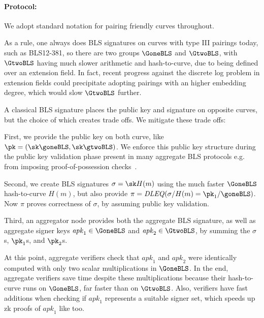 \paragraph{Protocol:}

We adopt standard notation for pairing friendly curves throughout.

As a rule, one always does BLS signatures on curves with type III pairings
today, such as BLS12-381, so there are two groups $\GoneBLS$ and $\GtwoBLS$,
with $\GtwoBLS$ having much slower arithmetic and hash-to-curve, due to
being defined over an extension field.  In fact, recent progress
\cite{TNFS} against the discrete log problem in extension fields
could precipitate adopting pairings with an higher embedding degree,
which would slow $\GtwoBLS$ further.

A classical BLS signature places the public key and signature on opposite
curves, but the choice of which creates trade offs.  We mitigate these
trade offs:

First, we provide the public key on both curve,
 like $\pk = (\sk \goneBLS, \sk \gtwoBLS)$.
We enforce this public key structure during the public key validation
phase present in many aggregate BLS protocols e.g. from 
imposing proof-of-possession checks~\cite{proofs_of_posession}.  %

Second, we create BLS signatures $\sigma = \sk H(m)$ using the much
faster $\GoneBLS$ hash-to-curve $H(m)$, but also provide
 $\pi = \mathit{DLEQ}( \sigma / H(m) = \pk_1 / \goneBLS)$.
Now $\pi$ proves correctness of $\sigma$, by
 assuming public key validation.

\def\apk{\mathit{apk}}

Third, an aggregator node provides both the aggregate BLS signature,
as well as aggregate signer keys $\apk_1 \in \GoneBLS$ and
$\apk_2 \in \GtwoBLS$, by summing the $\sigma$s, $\pk_1$s, and $\pk_2$s.

At this point, aggregate verifiers check that $\apk_1$ and $\apk_2$ were
identically computed with only two scalar multiplications in $\GoneBLS$.
In the end, aggregate verifiers save time despite these multiplications
because their hash-to-curve runs on $\GoneBLS$, far faster than on $\GtwoBLS$.
Also, verifiers have fast additions when checking if $\apk_1$ represents
a suitable signer set, which speeds up zk proofs of $\apk_1$ like \cite{ourLC} too.



